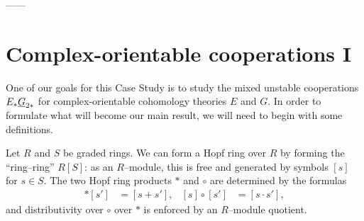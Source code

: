 ------













\section{Complex-orientable cooperations I}

One of our goals for this Case Study is to study the mixed unstable cooperations $E_* \underline{\smash{G}}_{2*}$ for complex-orientable cohomology theories $E$ and $G$.  In order to formulate what will become our main result, we will need to begin with some definitions.

\begin{definition}
Let $R$ and $S$ be graded rings.  We can form a Hopf ring over $R$ by forming the ``ring--ring'' $R[S]$: as an $R$--module, this is free and generated by symbols $[s]$ for $s \in S$.  The two Hopf ring products $\ast$ and $\circ$ are determined by the formulas
\begin{align*}
[s] \ast [s'] & = [s + s'], &
[s] \circ [s'] & = [s \cdot s'],
\end{align*}
and distributivity over $\circ$ over $\ast$ is enforced by an $R$--module quotient.
\end{definition}

